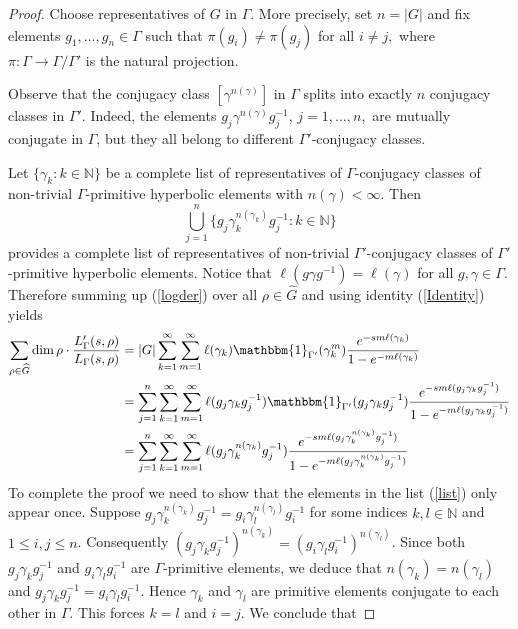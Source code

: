 \documentclass[12pt]{article}
\begin{document}
\begin{proof}
Choose representatives of $ G $ in $ \Gamma $. More precisely, set $ n = \vert G\vert $ and fix elements $ g_{1},\dots, g_{n}\in \Gamma $ such that $ \pi(g_{i})\neq \pi(g_{j}) $ for all $ i\neq j, $ where $ \pi:\Gamma\to \Gamma/\Gamma' $ is the natural projection.

Observe that the conjugacy class $ [\gamma^{n(\gamma)}] $ in $ \Gamma $ splits into exactly $ n $ conjugacy classes in $ \Gamma' $. Indeed, the elements $ g_{j}\gamma^{n(\gamma)}g_{j}^{-1}$, $ j=1,\dots, n, $ are mutually conjugate in $ \Gamma $, but they all belong to different $ \Gamma' $-conjugacy classes.

Let $ \{ \gamma_{k} : k\in \mathbb{N}\} $ be a complete list of representatives of $ \Gamma $-conjugacy classes of non-trivial $ \Gamma $-primitive hyperbolic elements with $ n(\gamma) < \infty $. Then
\begin{equation}\label{list}
\bigcup_{j=1}^{n} \{ g_{j}\gamma_{k}^{n(\gamma_{k})}g_{j}^{-1} : k\in \mathbb{N}\}
\end{equation}
provides a complete list of representatives of non-trivial $ \Gamma' $-conjugacy classes of $ \Gamma' $-primitive hyperbolic elements.
Notice that $ \ell(g\gamma g^{-1}) = \ell(\gamma) $ for all $ g,\gamma\in \Gamma $. Therefore summing up (\ref{logder}) over all $ \rho\in \widehat{G} $ and using identity (\ref{Identity}) yields
\begin{align*}
\sum_{\rho\in \widehat{G}} \dim \rho \cdot \frac{L_{\Gamma}'(s,\rho)}{L_{\Gamma}(s,\rho)} &= \vert G\vert \sum_{k=1}^{\infty}\sum_{m=1}^{\infty} \ell(\gamma_{k}) \mathbbm{1}_{\Gamma'}(\gamma_{k}^{m}) \frac{e^{-sm\ell(\gamma_{k})}}{1-e^{-m\ell(\gamma_{k})}}\\ 
 &= \sum_{j=1}^{n} \sum_{k=1}^{\infty}\sum_{m=1}^{\infty} \ell(g_{j}\gamma_{k}g_{j}^{-1}) \mathbbm{1}_{\Gamma'}(g_{j}\gamma_{k}g_{j}^{-1}) \frac{e^{-sm\ell(g_{j}\gamma_{k}g_{j}^{-1})}}{1-e^{-m\ell(g_{j}\gamma_{k}g_{j}^{-1})}}\\
 &= \sum_{j=1}^{n} \sum_{k=1}^{\infty}\sum_{m=1}^{\infty} \ell(g_{j}\gamma_{k}^{n(\gamma_{k})}g_{j}^{-1})  \frac{e^{-sm\ell(g_{j}\gamma_{k}^{n(\gamma_{k})}g_{j}^{-1})}}{1-e^{-m\ell(g_{j}\gamma_{k}^{n(\gamma_{k})}g_{j}^{-1})}} 
\end{align*}
To complete the proof we need to show that the elements in the list (\ref{list}) only appear once. Suppose  $ g_{j}\gamma_{k}^{n(\gamma_{k})}g_{j}^{-1} = g_{i}\gamma_{l}^{n(\gamma_{l})}g_{i}^{-1} $ for some indices $ k,l\in \mathbb{N} $ and $ 1\leq i,j\leq n $. Consequently $ (g_{j}\gamma_{k}g_{j}^{-1})^{n(\gamma_{k})} = (g_{i}\gamma_{l}g_{i}^{-1})^{n(\gamma_{l})} $. Since both $ g_{j}\gamma_{k}g_{j}^{-1} $ and $ g_{i}\gamma_{l}g_{i}^{-1} $ are $ \Gamma $-primitive elements, we deduce that $ n(\gamma_{k}) = n(\gamma_{l}) $ and $ g_{j}\gamma_{k}g_{j}^{-1} = g_{i}\gamma_{l}g_{i}^{-1} $. Hence $ \gamma_{k} $ and $ \gamma_{l} $ are primitive elements conjugate to each other in $ \Gamma $. This forces $ k=l $ and $ i=j $. We conclude that

\end{proof}
\end{document}
